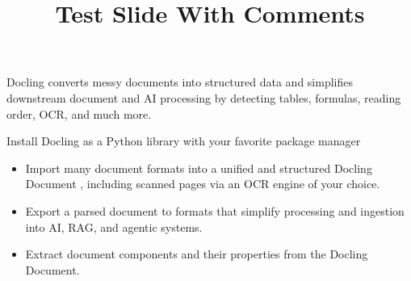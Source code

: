 \documentclass[11pt,a4paper]{article}
\title{Test Slide With Comments}
\begin{document}
\maketitle

Docling converts messy documents into structured data and simplifies downstream document and AI processing by detecting tables, formulas, reading order, OCR, and much more.

Install Docling as a Python library with your favorite package manager

\begin{itemize}
\item Import many document formats into a unified and structured Docling Document , including scanned pages via an OCR engine of your choice.
\item Export a parsed document to formats that simplify processing and ingestion into AI, RAG, and agentic systems. 
\item Extract document components and their properties from the Docling Document.
\end{itemize}
\end{document}
